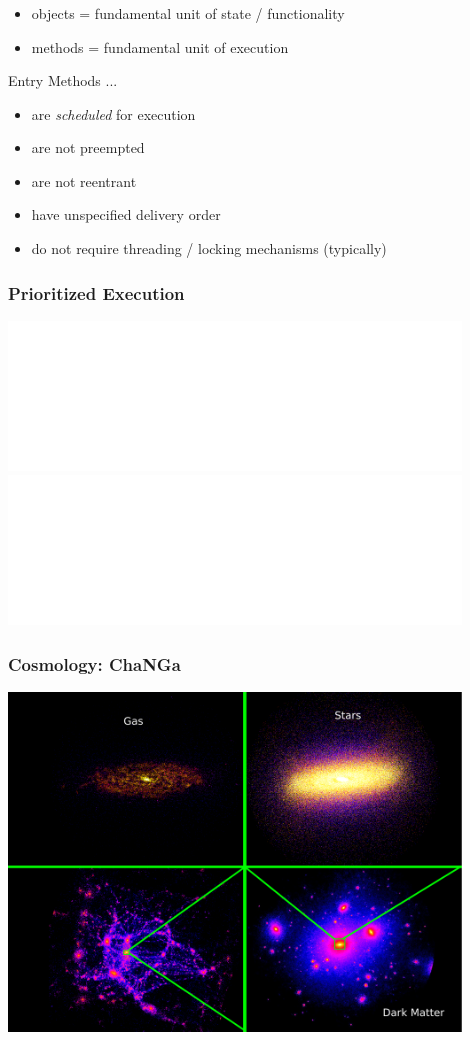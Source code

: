 \begin{frame}
\frametitle{\charm}
\begin{itemize}
    \item objects = fundamental unit of state / functionality
    \item methods = fundamental unit of execution
\end{itemize}
\pause
\begin{block}{Entry Methods ...}
\begin{itemize}[<+->]
    \item are \emph{scheduled} for execution
    \item are not preempted
    \item are not reentrant
    \item have unspecified delivery order
    \item do not require threading / locking mechanisms (typically)
\end{itemize}
\end{block}
\end{frame}


\begin{frame}
\frametitle{Prioritized Execution}
	\begin{center}
        \includegraphics<1>[width=0.9\textwidth]{../figures/progmodel/16-scheduler.pdf}
        \includegraphics<2>[width=0.9\textwidth]{../figures/progmodel/17-prio-scheduling.pdf}
	\end{center}
\end{frame}



\begin{frame}
\frametitle{Cosmology: ChaNGa}
\begin{center}
\includegraphics[width=0.9\textwidth]{../figures/changa-length-scales.pdf}
\end{center}
\end{frame}


